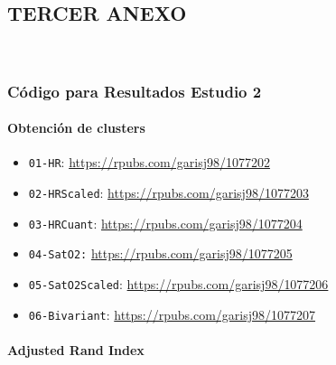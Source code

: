 \subsection{TERCER ANEXO}~\label{sec:anexo3}

\subsubsection{Código para Resultados Estudio 2}

\paragraph{Obtención de clusters}

\begin{itemize}
    \item \texttt{01-HR}: \url{https://rpubs.com/garisj98/1077202}
    \item \texttt{02-HRScaled}: \url{https://rpubs.com/garisj98/1077203}
    \item \texttt{03-HRCuant}: \url{https://rpubs.com/garisj98/1077204}
    \item \texttt{04-SatO2:} \url{https://rpubs.com/garisj98/1077205}
    \item \texttt{05-SatO2Scaled}: \url{https://rpubs.com/garisj98/1077206}
    \item \texttt{06-Bivariant}: \url{https://rpubs.com/garisj98/1077207}
\end{itemize}

\paragraph{Adjusted Rand Index}

